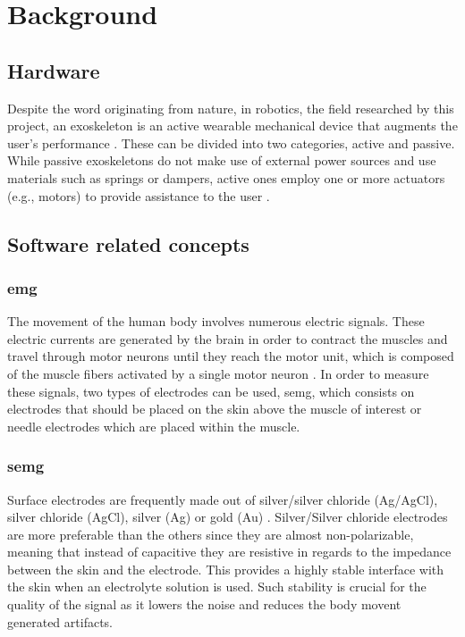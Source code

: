 \section{Background}
\label{section:background}

\subsection{Hardware}

Despite the word originating from nature, in robotics, the field researched by this project, an exoskeleton is an active wearable 
mechanical device that augments the user's performance \cite{exodefinition}. These can be divided into two categories, active and passive. 
While passive exoskeletons do not make use of external power sources and use materials such as springs or dampers, active ones employ 
one or more actuators (e.g., motors) to provide assistance to the user \cite{passiveactiveexo}.


\subsection{Software related concepts}

\subsubsection{\acf{emg}}

The movement of the human body involves numerous electric signals. These electric currents are generated by the brain
in order to contract the muscles and travel through motor neurons until they reach the motor unit, which is composed of the muscle fibers
activated by a single motor neuron \cite{emggen}. In order to measure these signals, two types of electrodes can be used, \ac{semg}, 
which consists on electrodes that should be placed on the skin above the muscle of interest or needle electrodes which are placed within 
the muscle. 

\subsubsection{\acf{semg}}

Surface electrodes are frequently made out of silver/silver chloride (Ag/AgCl), silver chloride (AgCl), silver (Ag) or gold (Au) \cite{sEMG}.
Silver/Silver chloride electrodes are more preferable than the others since they are almost non-polarizable, meaning that instead of capacitive
they are resistive in regards to the impedance between the skin and the electrode. This provides a highly stable interface with the skin when 
an electrolyte solution is used. Such stability is crucial for the quality of the signal as it lowers the noise and reduces the body movent generated
artifacts.

